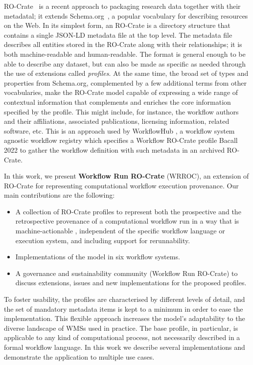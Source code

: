 \documentclass[10pt,letterpaper]{article}
\begin{document}
RO-Crate~\cite{Soiland-Reyes 2022a} is a recent approach to packaging research data together with their metadatal; it extends Schema.org~\cite{Guha 2015}, a popular vocabulary for describing resources on the Web.
In its simplest form, an RO-Crate is a directory structure that contains a single JSON-LD metadata file at the top level.
The metadata file describes all entities stored in the RO-Crate along with their relationships; it is both machine-readable and human-readable.
The format is general enough to be able to describe any dataset, but can also be made as specific as needed through the use of extensions called
\emph{profiles}.
At the same time, the broad set of types and properties from Schema.org, complemented by a few additional terms from other vocabularies, make the RO-Crate model capable of expressing a wide range of contextual information that complements and enriches the core information specified by the profile.
This might include, for instance, the workflow authors and their affiliations, associated publications, licensing information, related software, etc.
This is an approach used by WorkflowHub \cite{Goble 2021}, a workflow system agnostic workflow registry which specifies a Workflow RO-Crate profile {Bacall 2022} to gather the workflow definition with such metadata in an archived RO-Crate. 

In this work, we present \textbf{Workflow Run RO-Crate} (WRROC), an extension of RO-Crate for representing computational workflow execution provenance.
Our main contributions are the following:

\begin{itemize}
\item   A collection of RO-Crate profiles to represent both the prospective and the retrospective provenance of a computational   workflow run in a way that is machine-actionable \cite{Batista 2022},  independent of the specific  workflow language or   execution system, and including support for rerunnability.
\item   Implementations of the model in six workflow systems.
\item   A governance and sustainability community (Workflow Run RO-Crate) to discuss extensions,  issues and new implementations for the proposed   profiles.
\end{itemize}

To foster usability, the profiles are characterised by different levels of detail, and the set of mandatory metadata items is kept to a minimum in order to ease the implementation.
This flexible approach increases the model's adaptability to the diverse landscape of WMSs used in practice.
The base profile, in particular, is applicable to any kind of computational process, not necessarily described in a formal workflow language.
In this work we describe several implementations and demonstrate the application to multiple use cases.
\end{document}
